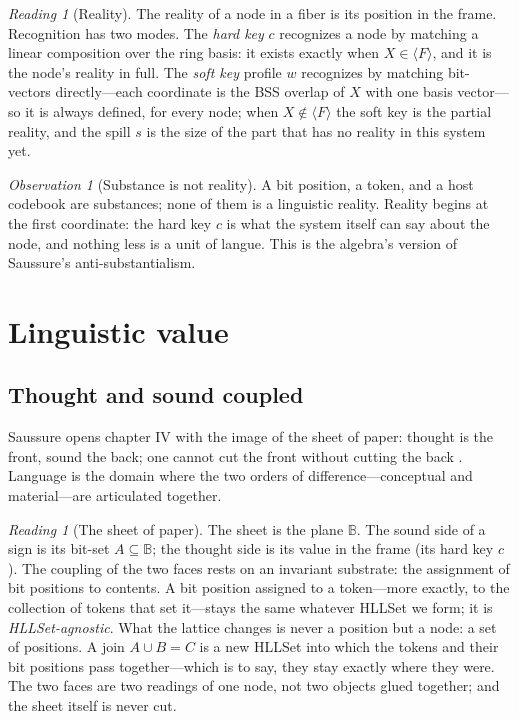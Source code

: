 \documentclass[11pt,a4paper]{article}
\theoremstyle{remark}
\newtheorem{observation}[principle]{Observation}
\newtheorem{reading}[principle]{Reading}
\newcommand{\Plane}{\ensuremath{\mathbb{B}}}            %
\newcommand{\spanof}[1]{\ensuremath{\langle #1\rangle}}  %
\begin{document}
\begin{reading}[Reality]
\label{read:reality}
The reality of a node in a fiber is its position in the frame. Recognition
has two modes. The \emph{hard key} $c$ recognizes a node by matching a
linear composition over the ring basis: it exists exactly when
$X \in \spanof{F}$, and it is the node's reality in full. The \emph{soft
key} profile $w$ recognizes by matching bit-vectors directly---each
coordinate is the BSS overlap of $X$ with one basis vector---so it is
always defined, for every node; when $X \notin \spanof{F}$ the soft key is
the partial reality, and the spill $s$ is the size of the part that has no
reality in this system yet.
\end{reading}

\begin{observation}[Substance is not reality]
A bit position, a token, and a host codebook are substances; none of them is a
linguistic reality. Reality begins at the first coordinate: the hard key $c$
is what the system itself can say about the node, and nothing less is a unit
of langue. This is the algebra's version of Saussure's anti-substantialism.
\end{observation}

\section{Linguistic value}
\label{sec:value}

\subsection{Thought and sound coupled}
\label{sec:thought-sound}

Saussure opens chapter IV with the image of the sheet of paper: thought is the
front, sound the back; one cannot cut the front without cutting the back
\cite[Part II, ch.~IV, \S1]{harris1983}. Language is the domain where the two
orders of difference---conceptual and material---are articulated together.

\begin{reading}[The sheet of paper]
\label{read:paper}
The sheet is the plane $\Plane$. The sound side of a sign is its bit-set
$A \subseteq \Plane$; the thought side is its value in the frame (its hard
key $c$). The coupling of the two faces rests on an invariant substrate: the
assignment of bit positions to contents. A bit position assigned to a
token---more exactly, to the collection of tokens that set it---stays the
same whatever HLLSet we form; it is \emph{HLLSet-agnostic}. What the lattice
changes is never a position but a node: a set of positions. A join
$A \cup B = C$ is a new HLLSet into which the tokens and their bit positions
pass together---which is to say, they stay exactly where they were. The two
faces are two readings of one node, not two objects glued together; and the
sheet itself is never cut.
\end{reading}
\end{document}
